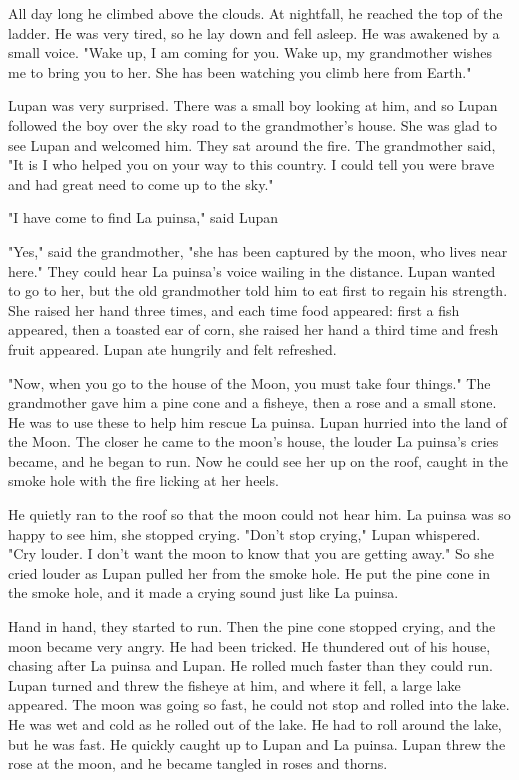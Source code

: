 All day long he climbed above the clouds. At nightfall, he reached the top of the ladder. He was very tired, so he lay down and fell asleep. He was awakened by a small voice. "Wake up, I am coming for you. Wake up, my grandmother wishes me to bring you to her. She has been watching you climb here from Earth."

Lupan was very surprised. There was a small boy looking at him, and so Lupan followed the boy over the sky road to the grandmother's house. She was glad to see Lupan and welcomed him. They sat around the fire. The grandmother said, "It is I who helped you on your way to this country. I could tell you were brave and had great need to come up to the sky."

"I have come to find La puinsa," said Lupan

"Yes," said the grandmother, "she has been captured by the moon, who lives near here." They could hear La puinsa's voice wailing in the distance. Lupan wanted to go to her, but the old grandmother told him to eat first to regain his strength. She raised her hand three times, and each time food appeared: first a fish appeared, then a toasted ear of corn, she raised her hand a third time and fresh fruit appeared. Lupan ate hungrily and felt refreshed.

"Now, when you go to the house of the Moon, you must take four things." The grandmother gave him a pine cone and a fisheye, then a rose and a small stone. He was to use these to help him rescue La puinsa. Lupan hurried into the land of the Moon. The closer he came to the moon's house, the louder La puinsa's cries became, and he began to run. Now he could see her up on the roof, caught in the smoke hole with the fire licking at her heels.

He quietly ran to the roof so that the moon could not hear him. La puinsa was so happy to see him, she stopped crying. "Don't stop crying," Lupan whispered. "Cry louder. I don't want the moon to know that you are getting away." So she cried louder as Lupan pulled her from the smoke hole. He put the pine cone in the smoke hole, and it made a crying sound just like La puinsa.

Hand in hand, they started to run. Then the pine cone stopped crying, and the moon became very angry. He had been tricked. He thundered out of his house, chasing after La puinsa and Lupan. He rolled much faster than they could run. Lupan turned and threw the fisheye at him, and where it fell, a large lake appeared. The moon was going so fast, he could not stop and rolled into the lake. He was wet and cold as he rolled out of the lake. He had to roll around the lake, but he was fast. He quickly caught up to Lupan and La puinsa. Lupan threw the rose at the moon, and he became tangled in roses and thorns.

